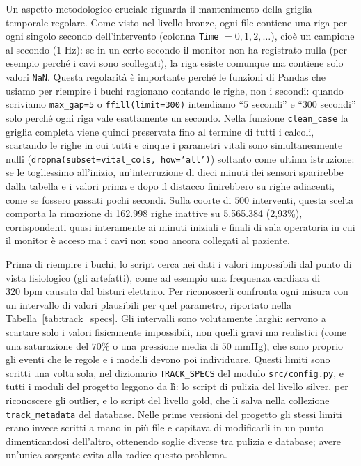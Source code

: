 Un aspetto metodologico cruciale riguarda il mantenimento della griglia temporale regolare. Come visto nel livello bronze, ogni file contiene una riga per ogni singolo secondo dell'intervento (colonna \texttt{Time} $= 0, 1, 2, \dots$), cio\`e un campione al secondo ($1\text{ Hz}$): se in un certo secondo il monitor non ha registrato nulla (per esempio perch\'e i cavi sono scollegati), la riga esiste comunque ma contiene solo valori \texttt{NaN}. Questa regolarit\`a \`e importante perch\'e le funzioni di Pandas che usiamo per riempire i buchi ragionano contando le righe, non i secondi: quando scriviamo \texttt{max\_gap=5} o \texttt{ffill(limit=300)} intendiamo ``$5$ secondi'' e ``$300$ secondi'' solo perch\'e ogni riga vale esattamente un secondo. Nella funzione \texttt{clean\_case} la griglia completa viene quindi preservata fino al termine di tutti i calcoli, scartando le righe in cui tutti e cinque i parametri vitali sono simultaneamente nulli (\texttt{dropna(\allowbreak subset=vital\_cols,\allowbreak\ how='all')}) soltanto come ultima istruzione: se le togliessimo all'inizio, un'interruzione di dieci minuti dei sensori sparirebbe dalla tabella e i valori prima e dopo il distacco finirebbero su righe adiacenti, come se fossero passati pochi secondi. Sulla coorte di $500$ interventi, questa scelta comporta la rimozione di 162.998 righe inattive su 5.565.384 (2,93\%), corrispondenti quasi interamente ai minuti iniziali e finali di sala operatoria in cui il monitor \`e acceso ma i cavi non sono ancora collegati al paziente.

Prima di riempire i buchi, lo script cerca nei dati i valori impossibili dal punto di vista fisiologico (gli artefatti), come ad esempio una frequenza cardiaca di $320\text{ bpm}$ causata dal bisturi elettrico. Per riconoscerli confronta ogni misura con un intervallo di valori plausibili per quel parametro, riportato nella Tabella~\ref{tab:track_specs}. Gli intervalli sono volutamente larghi: servono a scartare solo i valori fisicamente impossibili, non quelli gravi ma realistici (come una saturazione del $70\%$ o una pressione media di $50\text{ mmHg}$), che sono proprio gli eventi che le regole e i modelli devono poi individuare. Questi limiti sono scritti una volta sola, nel dizionario \texttt{TRACK\_SPECS} del modulo \texttt{src/config.py}, e tutti i moduli del progetto leggono da l\`i: lo script di pulizia del livello silver, per riconoscere gli outlier, e lo script del livello gold, che li salva nella collezione \texttt{track\_metadata} del database. Nelle prime versioni del progetto gli stessi limiti erano invece scritti a mano in pi\`u file e capitava di modificarli in un punto dimenticandosi dell'altro, ottenendo soglie diverse tra pulizia e database; avere un'unica sorgente evita alla radice questo problema.

